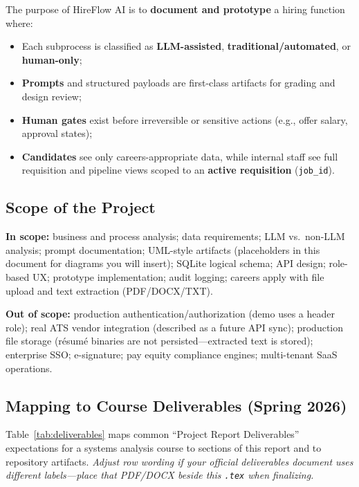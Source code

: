 \documentclass[12pt]{article}
\begin{document}
The purpose of HireFlow AI is to \textbf{document and prototype} a hiring function where:
\begin{itemize}
    \item Each subprocess is classified as \textbf{LLM-assisted}, \textbf{traditional/automated}, or \textbf{human-only};
    \item \textbf{Prompts} and structured payloads are first-class artifacts for grading and design review;
    \item \textbf{Human gates} exist before irreversible or sensitive actions (e.g., offer salary, approval states);
    \item \textbf{Candidates} see only careers-appropriate data, while internal staff see full requisition and pipeline views scoped to an \textbf{active requisition} (\texttt{job\_id}).
\end{itemize}

\subsection{Scope of the Project}

\textbf{In scope:} business and process analysis; data requirements; LLM vs.\ non-LLM analysis; prompt documentation; UML-style artifacts (placeholders in this document for diagrams you will insert); SQLite logical schema; API design; role-based UX; prototype implementation; audit logging; careers apply with file upload and text extraction (PDF/DOCX/TXT).

\textbf{Out of scope:} production authentication/authorization (demo uses a header role); real ATS vendor integration (described as a future API sync); production file storage (résumé binaries are not persisted---extracted text is stored); enterprise SSO; e-signature; pay equity compliance engines; multi-tenant SaaS operations.

\subsection{Mapping to Course Deliverables (Spring 2026)}

Table~\ref{tab:deliverables} maps common ``Project Report Deliverables'' expectations for a systems analysis course to sections of this report and to repository artifacts. \textit{Adjust row wording if your official deliverables document uses different labels---place that PDF/DOCX beside this \texttt{.tex} when finalizing.}
\end{document}
